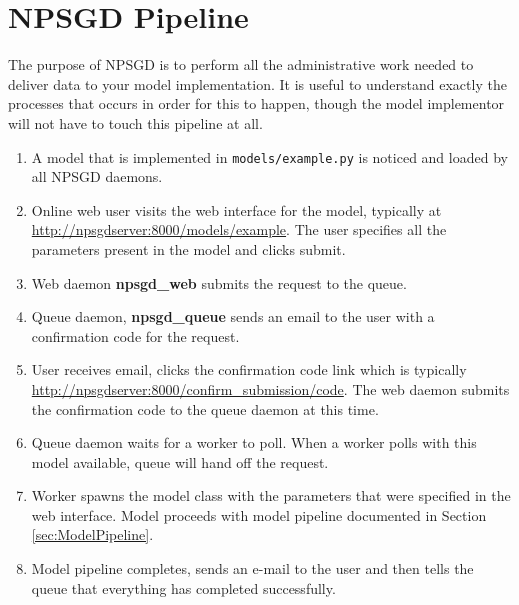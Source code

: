 \documentclass{article}
\newcommand{\mpath}[1]{\texttt{#1}}
\begin{document}
\section{NPSGD Pipeline}
The purpose of NPSGD is to perform all the administrative work needed to deliver
data to your model implementation. It is useful to understand exactly the
processes that occurs in order for this to happen, though the model implementor
will not have to touch this pipeline at all.
\begin{enumerate}
   \item A model that is implemented in \mpath{models/example.py} is noticed and
   loaded by all NPSGD daemons.
   \item Online web user visits the web interface for the model, typically at
   \url{http://npsgdserver:8000/models/example}. The user specifies all the parameters
   present in the model and clicks submit.
   \item Web daemon \textbf{npsgd\_web} submits the request to the queue.
   \item Queue daemon, \textbf{npsgd\_queue} sends an email to the user with a
   confirmation code for the request.
   \item User receives email, clicks the confirmation code link which is
   typically \url{http://npsgdserver:8000/confirm_submission/code}. The web
   daemon submits the confirmation code to the queue daemon at this time.
   \item Queue daemon waits for a worker to poll. When a worker polls with this
   model available, queue will hand off the request. 
   \item Worker spawns the model class with the parameters that were specified
   in the web interface. Model proceeds with model pipeline documented in
   Section \ref{sec:ModelPipeline}.
   \item Model pipeline completes, sends an e-mail to the user and then tells
   the queue that everything has completed successfully.
\end{enumerate}
\end{document}

